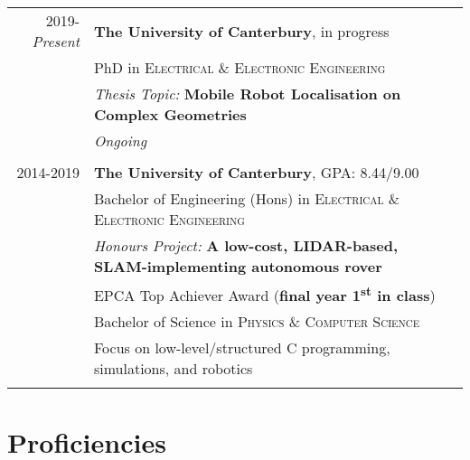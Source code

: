 \documentclass[a4paper,10pt]{article} %
\begin{document}
\begin{tabular}{r|l}	

2019-\emph{Present} & \normalsize \textbf{The University of Canterbury}, in progress \\
& PhD in \textsc{Electrical \& Electronic Engineering} \\
& \quad \small\emph{Thesis Topic:} \textbf{Mobile Robot Localisation on Complex Geometries} \\
& \quad \small\emph{Ongoing} \\
\multicolumn{2}{c}{} \\

2014-2019 & \normalsize \textbf{The University of Canterbury}, \normalsize \textsc{GPA}: 8.44/9.00 \\
& Bachelor of Engineering (Hons) in \textsc{Electrical \& Electronic Engineering} \\
& \quad \small\emph{Honours Project:} \textbf{A low-cost, LIDAR-based, SLAM-implementing autonomous rover} \\
& \quad \small EPCA Top Achiever Award (\textbf{final year 1\textsuperscript{st} in class}) \\
& Bachelor of Science in \textsc{Physics \& Computer Science} \\
& \quad \small Focus on low-level/structured C programming, simulations, and robotics \\
\multicolumn{2}{c}{} \\


\end{tabular}





\section{Proficiencies}
\end{document}
